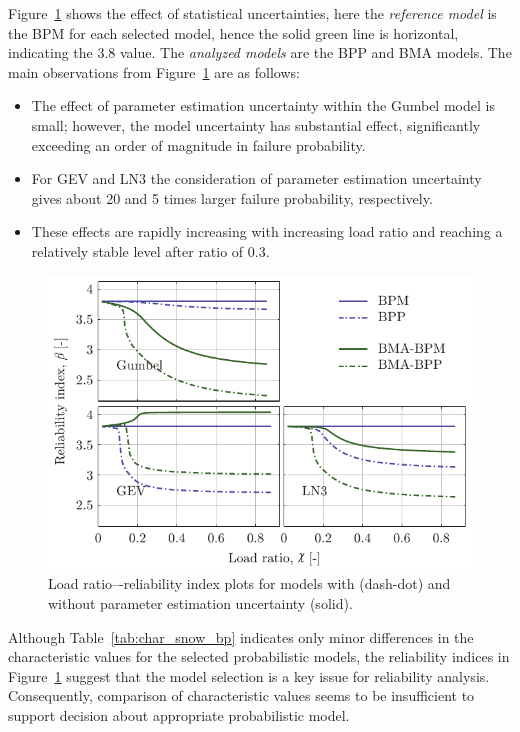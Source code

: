 Figure~\ref{fig:beta_khi_bma_2x2} shows the effect of statistical uncertainties, here the \textit{reference model} is the BPM for each selected model, hence the solid green line is horizontal, indicating the 3.8 value. The \textit{analyzed models} are the BPP and BMA models. The main observations from Figure~\ref{fig:beta_khi_bma_2x2} are as follows:
\begin{itemize}
	\item The effect of parameter estimation uncertainty within the Gumbel model is small; however, the model uncertainty has substantial effect, significantly exceeding an order of magnitude in failure probability.
	\item For GEV and LN3 the consideration of parameter estimation uncertainty gives about 20 and 5 times larger failure probability, respectively.
	\item These effects are rapidly increasing with increasing load ratio and reaching a relatively stable level after ratio of 0.3.
\end{itemize}


\begin{figure}[htbp!]
	\centering    
	\includegraphics[]{khi_beta_2x2_BPM_BPP_BMA_ID2546_CI09_02.pdf}
	\caption{Load ratio–-reliability index plots for models with (dash-dot) and without parameter estimation uncertainty (solid).}
	\label{fig:beta_khi_bma_2x2}
\end{figure}

Although Table~\ref{tab:char_snow_bp} indicates only minor differences in the characteristic values for the selected probabilistic models, the reliability indices in Figure~\ref{fig:beta_khi_bma_2x2} suggest that the model selection is a key issue for reliability analysis. Consequently, comparison of characteristic values seems to be insufficient to support decision about appropriate probabilistic model.


